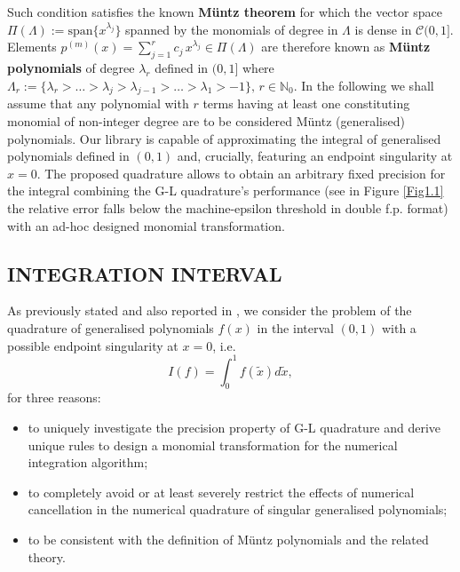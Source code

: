 \documentclass[a4paper, twosided]{book}
\begin{document}
\noindent
Such condition satisfies the known \color{poliDarkBlue} \textbf{Müntz theorem} \color{black} for which the vector space $\Pi(\Lambda):=\text{span}\{x^{\lambda_j}\}$ spanned by the monomials of degree in $\Lambda$ is dense in $\mathcal{C}(0,1]$. Elements $p^{(m)}(x) = \sum_{j=1}^{r} c_j\,x^{\lambda_j}\in\Pi(\Lambda)$ are therefore known as \color{poliDarkBlue} \textbf{Müntz polynomials} \color{black} of degree $\lambda_r$ defined in $(0,1]$ where  $\Lambda_r:=\{\lambda_r>\dots>\lambda_j>\lambda_{j-1}>\dots>\lambda_1>-1\},\, r\in\mathbb{N}_0$. In the following we shall assume that any polynomial with $r$ terms having at least one constituting monomial of non-integer degree are to be considered Müntz (generalised) polynomials. Our library is capable of approximating the integral of generalised polynomials defined in $(0,1)$ and, crucially, featuring an endpoint singularity at $x=0$. The proposed quadrature allows to obtain an arbitrary fixed precision for the integral combining the G-L quadrature's performance (see in Figure \ref{Fig1.1} the relative error falls below the machine-epsilon threshold in double f.p. format) with an ad-hoc designed monomial transformation.



\subsection[Integration interval]{\changefont INTEGRATION INTERVAL}\label{SubSec1.2.5}

As previously stated and also reported in \cite{Lombardi21}, we consider the problem of the quadrature of generalised polynomials $f(x)$ in the interval $(0,1)$ with a possible endpoint singularity at $x=0$, i.e. 
\begin{equation}\label{eq1.11}
    I(f) = \int_0^1 f(\tilde{x}) d\tilde{x},
\end{equation}
for three reasons:
\begin{itemize}
  \item to uniquely investigate the precision property of G-L quadrature and derive unique rules to design a monomial transformation for the numerical integration algorithm;
  \item to completely avoid or at least severely restrict the effects of numerical cancellation in the numerical quadrature of singular generalised polynomials;
  \item to be consistent with the definition of Müntz polynomials and the related theory.
\end{itemize}
\end{document}
